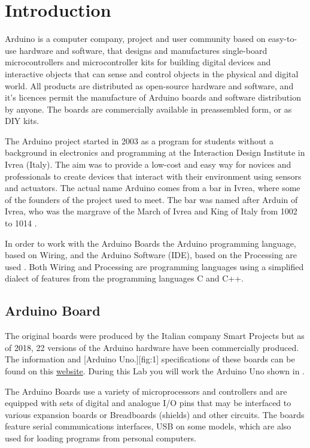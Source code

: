 \section{Introduction}
Arduino is a computer company, project and user community based on easy-to-use hardware and software, that designs and manufactures single-board microcontrollers and microcontroller kits for building digital devices and interactive objects that can sense and control objects in the physical and digital world. All products are distributed as open-source hardware and software, and it's licences permit the manufacture of Arduino boards and software distribution by anyone. The boards are commercially available in preassembled form, or as \ac{DIY} kits.\par

The Arduino project started in 2003 as a program for students without a background in electronics and programming at the Interaction Design Institute in Ivrea (Italy). The aim was to provide a low-cost and easy way for novices and professionals to create devices that interact with their environment using sensors and actuators. The actual name Arduino comes from a bar in Ivrea, where some of the founders of the project used to meet. The bar was named after Arduin of Ivrea, who was the margrave of the March of Ivrea and King of Italy from 1002 to 1014 \cite{wiki:1}. \par

In order to work with the Arduino Boards the Arduino programming language, based on Wiring, and the Arduino Software (\ac{IDE}), based on the Processing are used \cite{arduino:1}. Both Wiring and Processing are programming languages using a simplified dialect of features from the programming languages C and C++.

\subsection{Arduino Board}
The original boards were produced by the Italian company Smart Projects but as of 2018, 22 versions of the Arduino hardware have been commercially produced. The information and 
[Arduino Uno.][fig:1]
specifications of these boards can be found on this {\href{https://www.arduino.cc/en/Products/Compare}{website}}. During this Lab you will work the Arduino Uno shown in . \par 

The Arduino Boards use a variety of microprocessors and controllers and are equipped with sets of digital and analogue \ac{I/O} pins that may be interfaced to various expansion boards or Breadboards (shields) and other circuits. The boards feature serial communications interfaces, \ac{USB} on some models, which are also used for loading programs from personal computers.\par

